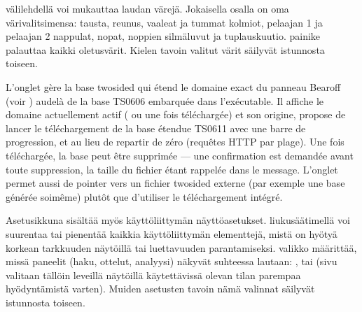 \documentclass[letterpaper,10pt,finnish]{sphinxmanual}
\begin{document}
\sphinxAtStartPar
{} \sphinxhyphen{}välilehdellä voi mukauttaa laudan värejä. Jokaisella osalla on oma värivalitsimensa: tausta, reunus, vaaleat ja tummat kolmiot, pelaajan 1 ja pelaajan 2 nappulat, nopat, noppien silmäluvut ja tuplauskuutio. \sphinxhyphen{}painike palauttaa kaikki oletusvärit. Kielen tavoin valitut värit säilyvät istunnosta toiseen.

\sphinxAtStartPar
L’onglet  gère la base two\sphinxhyphen{}sided qui étend le domaine exact du
panneau Bearoff (voir {\hyperref[\detokenize{manuel:panneau-epc}]{}}) au\sphinxhyphen{}delà de la base TS\sphinxhyphen{}06\sphinxhyphen{}06
embarquée dans l’exécutable. Il affiche le domaine actuellement actif
( ou  une fois téléchargée) et son origine, propose de
lancer le téléchargement de la base étendue TS\sphinxhyphen{}06\sphinxhyphen{}11 avec une barre de
progression, et  au
lieu de repartir de zéro (requêtes HTTP par plage). Une fois téléchargée, la
base peut être supprimée — une confirmation est demandée avant toute
suppression, la taille du fichier étant rappelée dans le message. L’onglet
permet aussi de pointer vers un fichier  two\sphinxhyphen{}sided externe (par exemple
une base générée soi\sphinxhyphen{}même) plutôt que d’utiliser le téléchargement intégré.

\sphinxAtStartPar
Asetusikkuna sisältää myös käyttöliittymän näyttöasetukset.  \sphinxhyphen{}liukusäätimellä voi suurentaa tai pienentää kaikkia käyttöliittymän elementtejä, mistä on hyötyä korkean tarkkuuden näytöillä tai luettavuuden parantamiseksi.  \sphinxhyphen{}valikko määrittää, missä paneelit (haku, ottelut, analyysi) näkyvät suhteessa lautaan: ,  tai  (sivu valitaan tällöin leveillä näytöillä käytettävissä olevan tilan parempaa hyödyntämistä varten). Muiden asetusten tavoin nämä valinnat säilyvät istunnosta toiseen.
\end{document}
